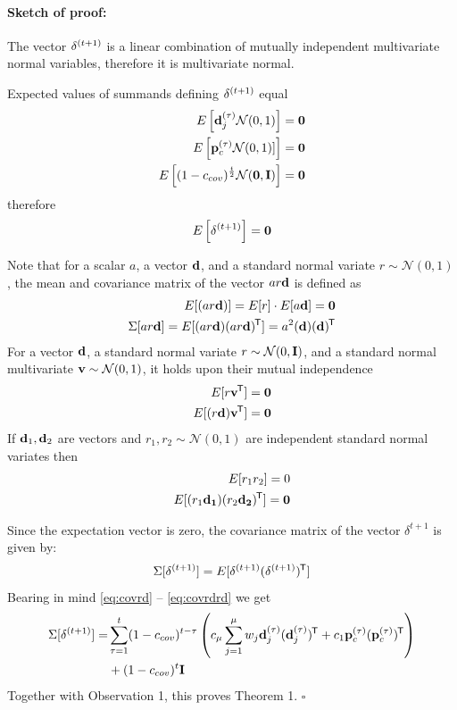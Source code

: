 \documentclass[dvipsnames,format=sigconf,anonymous=false,review=false]{acmart}
\begin{document}
\paragraph{Sketch of proof:}

The vector ${\bf \delta}^{(t+1)}$ is a linear combination of mutually independent multivariate normal variables, therefore it is multivariate normal.

Expected values of summands defining ${\bf \delta}^{(t+1)}$ equal
\begin{align}
E\left[{\bf d}_j^{(\tau)}  {\mathcal N}(0,1)\right] ={\bf 0} \\
E\left[ {\bf p}_c^{(\tau)} {\mathcal N}(0,1)]\right] ={\bf 0} \\
E\left[(1-c_{cov})^{\frac{t}{2}} {\mathcal N}({\bf 0},{\bf I})\right] = {\bf 0}
\end{align}
therefore
\begin{align}
E\left[{\bf \delta}^{(t+1)}\right] = {\bf 0}
\label{eq:expected}
\end{align}

Note that for a scalar $a$, a vector ${\bf d}$, and a standard normal variate $r \sim {\mathcal N}(0,1)$, the mean and covariance matrix of the vector $ar{\bf d}$ is defined as
\begin{align}
E[(ar{\bf d})]=E[r]\cdot E[a{\bf d}]={\bf 0}  \\
\Sigma[ar{\bf d}]=E[(ar{\bf d})(ar{\bf d})^{\mkern-1.5mu\mathsf{T}}]=a^2({\bf d})({\bf d})^{\mkern-1.5mu\mathsf{T}} 
\label{eq:covrd}
\end{align}
For a vector ${\bf d}$, a standard normal variate $r \sim {\mathcal N}(0,{\bf I})$, and a standard normal multivariate  ${\bf v} \sim {\mathcal N}(0,1)$, it holds upon their mutual independence
\begin{align}
E[r{\bf v}^{\mkern-1.5mu\mathsf{T}}]={\bf 0} \\
E[(r{\bf d}){\bf v}^{\mkern-1.5mu\mathsf{T}}]={\bf 0}
\label{eq:covrdv}
\end{align}
If ${\bf d}_1, {\bf d}_2$ are vectors and  $r_1,r_2 \sim {\mathcal N}(0,1)$ are independent standard normal variates then
\begin{align}
E[r_1r_2]=0 \\
E[(r_1{\bf d_1})(r_2{\bf d_2})^{\mkern-1.5mu\mathsf{T}}]={\bf 0}
\label{eq:covrdrd}
\end{align}

Since the expectation vector is zero, the covariance matrix of the vector $\delta^{t+1}$ is given by:
\begin{align}
\Sigma[{\bf \delta}^{(t+1)}]=E[{\bf \delta}^{(t+1)}({\bf \delta}^{(t+1)})^{\mkern-1.5mu\mathsf{T}}]
\end{align}
Bearing in mind \eqref{eq:covrd} -- \eqref{eq:covrdrd} we get
\begin{align}
\Sigma[{\bf \delta}^{(t+1)}] = 
&\sum_{\tau=1}^{t}(1-c_{cov})^{t-\tau} \left(c_\mu \sum_{j=1}^\mu w_j {\bf d}_j^{(\tau)}({\bf d}_j^{(\tau)})^{\mkern-1.5mu\mathsf{T}}  + c_1 {\bf p}_c^{(\tau)}({\bf p}_c^{(\tau)})^{\mkern-1.5mu\mathsf{T}} \right) \nonumber \\
&+(1-c_{cov})^t {\bf I}
\end{align}
%
Together with Observation 1, this proves Theorem 1. {\hfill$\square$}
\end{document}
